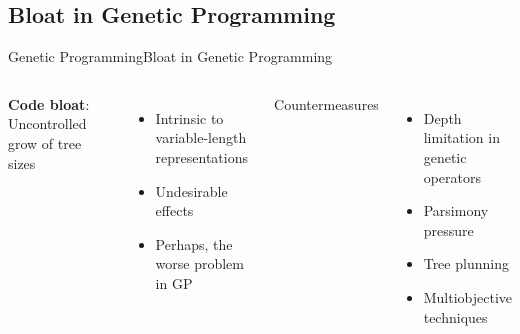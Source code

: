 \documentclass[10pt,compress]{beamer} %
\begin{document}
\subsection{Bloat in Genetic Programming}
\begin{frame}{Genetic Programming}{Bloat in Genetic Programming} 
	\vspace{-0.5cm}
    \begin{columns}
		\textbf{Code bloat}: Uncontrolled grow of tree sizes
		\begin{itemize}
			\item Intrinsic to variable-length representations
			\item Undesirable effects
			\item Perhaps, the worse problem in GP
		\end{itemize}

		Countermeasures
		\begin{itemize}
			\item Depth limitation in genetic operators
			\item Parsimony pressure
			\item Tree plunning
			\item Multiobjective techniques
		\end{itemize}


\end{columns}
\end{frame}
\end{document}
